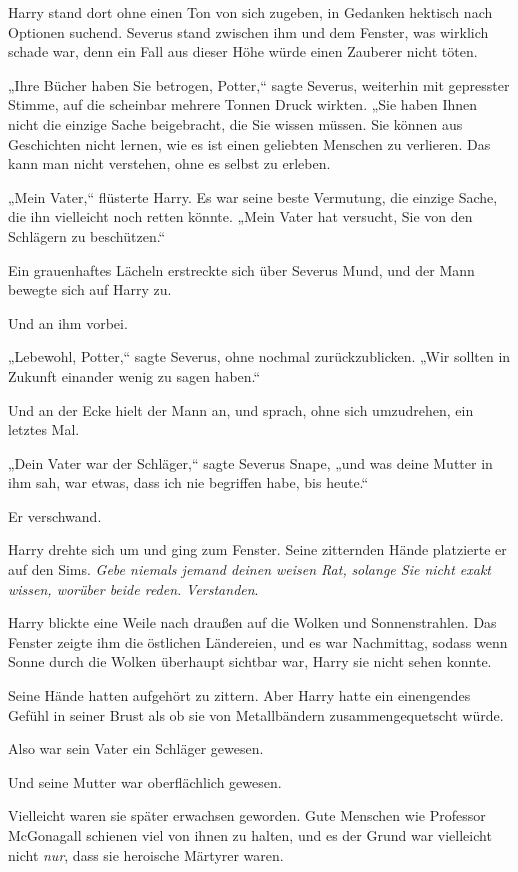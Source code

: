 {Harry stand dort ohne einen Ton von sich zugeben, in Gedanken hektisch nach Optionen suchend. Severus stand zwischen ihm und dem Fenster, was wirklich schade war, denn ein Fall aus dieser Höhe würde einen Zauberer nicht töten.

„Ihre Bücher haben Sie betrogen, Potter,“ sagte Severus, weiterhin mit gepresster Stimme, auf die scheinbar mehrere Tonnen Druck wirkten. „Sie haben Ihnen nicht die einzige Sache beigebracht, die Sie wissen müssen. Sie können aus Geschichten nicht lernen, wie es ist einen geliebten Menschen zu verlieren. Das kann man nicht verstehen, ohne es selbst zu erleben.

„Mein Vater,“ flüsterte Harry. Es war seine beste Vermutung, die einzige Sache, die ihn vielleicht noch retten könnte. „Mein Vater hat versucht, Sie von den Schlägern zu beschützen.“

Ein grauenhaftes Lächeln erstreckte sich über Severus Mund, und der Mann bewegte sich auf Harry zu.

Und an ihm vorbei.

„Lebewohl, Potter,“ sagte Severus, ohne nochmal zurückzublicken. „Wir sollten in Zukunft einander wenig zu sagen haben.“

Und an der Ecke hielt der Mann an, und sprach, ohne sich umzudrehen, ein letztes Mal.

„Dein Vater war der Schläger,“ sagte Severus Snape, „und was deine Mutter in ihm sah, war etwas, dass ich nie begriffen habe, bis heute.“

Er verschwand.

Harry drehte sich um und ging zum Fenster. Seine zitternden Hände platzierte er auf den Sims. \emph{Gebe niemals jemand deinen weisen Rat,} \emph{solange Sie nicht exakt wissen, worüber beide reden.} \emph{Verstanden}.

Harry blickte eine Weile nach draußen auf die Wolken und Sonnenstrahlen. Das Fenster zeigte ihm die östlichen Ländereien, und es war Nachmittag, sodass wenn Sonne durch die Wolken überhaupt sichtbar war, Harry sie nicht sehen konnte.

Seine Hände hatten aufgehört zu zittern. Aber Harry hatte ein einengendes Gefühl in seiner Brust als ob sie von Metallbändern zusammengequetscht würde.

Also war sein Vater ein Schläger gewesen.

Und seine Mutter war oberflächlich gewesen.

Vielleicht waren sie später erwachsen geworden. Gute Menschen wie Professor McGonagall schienen viel von ihnen zu halten, und es der Grund war vielleicht nicht \emph{nur}, dass sie heroische Märtyrer waren.

}
